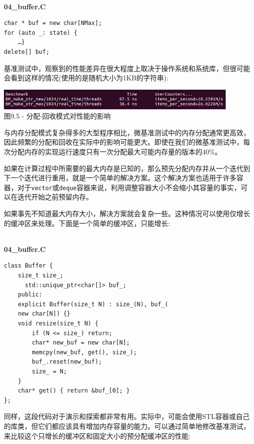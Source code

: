 \hspace*{\fill} \\ %
\noindent
\textbf{04\_buffer.C}
\begin{lstlisting}[style=styleCXX]
char * buf = new char[NMax];
for (auto _: state) {
	…}
delete[] buf;
\end{lstlisting}

基准测试中，观察到的性能差异在很大程度上取决于操作系统和系统库，但很可能会看到这样的情况(使用的是随机大小为1KB的字符串):

\begin{center}
\includegraphics[width=0.9\textwidth]{content/3/chapter9/images/5.jpg}\\
图9.5 - 分配-回收模式对性能的影响
\end{center}

与内存分配模式复杂得多的大型程序相比，微基准测试中的内存分配通常更高效，因此频繁的分配和回收在实际中的影响可能更大。即使在我们的微基准测试中，每次分配内存的实现运行速度只有一次分配最大可能内存量的版本的40\%。 

如果在计算过程中所需要的最大内存是已知的，那么预先分配内存并从一个迭代到下一个迭代进行重用，就是一个简单的解决方案。这个解决方案也适用于许多容器，对于\texttt{vector}或\texttt{deque}容器来说，利用调整容器大小不会缩小其容量的事实，可以在迭代开始之前预留内存。

如果事先不知道最大内存大小，解决方案就会复杂一些。这种情况可以使用仅增长的缓冲区来处理。下面是一个简单的缓冲区，只能增长:

\hspace*{\fill} \\ %
\noindent
\textbf{04\_buffer.C}
\begin{lstlisting}[style=styleCXX]
class Buffer {
	size_t size_;
	  std::unique_ptr<char[]> buf_;
	public:
	explicit Buffer(size_t N) : size_(N), buf_(
	new char[N]) {}
	void resize(size_t N) { 
		if (N <= size_) return;
		char* new_buf = new char[N];
		memcpy(new_buf, get(), size_);
		buf_.reset(new_buf);
		size_ = N;
	}
	char* get() { return &buf_[0]; }
};
\end{lstlisting}

同样，这段代码对于演示和探索都非常有用。实际中，可能会使用STL容器或自己的库类，但它们都应该具有增加内存容量的能力。可以通过简单地修改基准测试，来比较这个只增长的缓冲区和固定大小的预分配缓冲区的性能:

